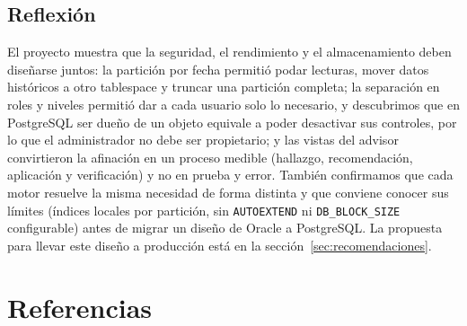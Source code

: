 \documentclass[12pt,a4paper]{article}
\begin{document}
\subsection{Reflexión}

El proyecto muestra que la seguridad, el rendimiento y el almacenamiento deben diseñarse juntos: la partición por fecha permitió podar lecturas, mover datos históricos a otro tablespace y truncar una partición completa; la separación en roles y niveles permitió dar a cada usuario solo lo necesario, y descubrimos que en PostgreSQL ser dueño de un objeto equivale a poder desactivar sus controles, por lo que el administrador no debe ser propietario; y las vistas del advisor convirtieron la afinación en un proceso medible (hallazgo, recomendación, aplicación y verificación) y no en prueba y error. También confirmamos que cada motor resuelve la misma necesidad de forma distinta y que conviene conocer sus límites (índices locales por partición, sin \texttt{AUTOEXTEND} ni \texttt{DB\_\allowbreak{}BLOCK\_\allowbreak{}SIZE} configurable) antes de migrar un diseño de Oracle a PostgreSQL. La propuesta para llevar este diseño a producción está en la sección~\ref{sec:recomendaciones}.

\section{Referencias}
\end{document}
